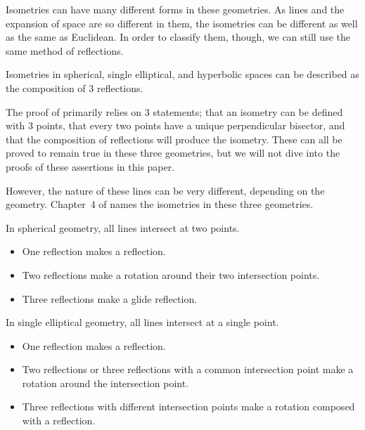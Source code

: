\documentclass{mystyle}
\begin{document}
Isometries can have many different forms in these geometries. As lines and the expansion of space are so different in them, the isometries can be different as well as the same as Euclidean. In order to classify them, though, we can still use the same method of reflections.

\begin{theorem}
    Isometries in spherical, single elliptical, and hyperbolic spaces can be described as the composition of 3 reflections.
\end{theorem}

The proof of  primarily relies on 3 statements; that an isometry can be defined with 3 points, that every two points have a unique perpendicular bisector, and that the composition of reflections will produce the isometry. These can all be proved to remain true in these three geometries, but we will not dive into the proofs of these assertions in this paper.   

However, the nature of these lines can be very different, depending on the geometry. Chapter~4 of \cite{sibley2015} names the isometries in these three geometries. 

In spherical geometry, all lines intersect at two points.
\begin{itemize}
    \item One reflection makes a reflection.
    \item Two reflections make a rotation around their two intersection points.
    \item Three reflections make a glide reflection.
\end{itemize}

In single elliptical geometry, all lines intersect at a single point.
\begin{itemize}
    \item One reflection makes a reflection.
    \item Two reflections or three reflections with a common intersection point make a rotation around the intersection point.
    \item Three reflections with different intersection points make a rotation composed with a reflection. 
\end{itemize}
\end{document}
